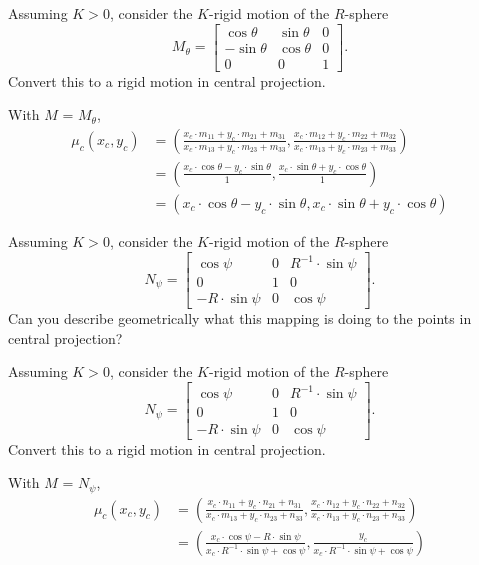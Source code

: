 \documentclass{ximera}
\begin{document}
\begin{problem}
  Assuming $K > 0$, consider the $K$-rigid motion of the $R$-sphere
  \[
  M_\theta=
  \begin{bmatrix}
    \cos\theta & \sin\theta & 0\\
    -\sin\theta & \cos\theta & 0\\
    0 & 0 & 1
  \end{bmatrix}.
  \]
  Convert this to a rigid motion in central projection.
  \begin{freeResponse}
   With $M$ = $M_\theta$,
  \begin{align*}
  \mu_c(x_c,y_c) &= \left( \frac{x_c\cdot m_{11} + y_c\cdot m_{21} + m_{31}}{x_c\cdot m_{13} + y_c\cdot m_{23} + m_{33}},
    \frac{x_c\cdot m_{12} + y_c\cdot m_{22} + m_{32}}{x_c\cdot m_{13} + y_c\cdot m_{23} + m_{33}} \right) \\
    &= \left( \frac{x_c\cdot \cos\theta - y_c\cdot \sin\theta}{1},
    \frac{x_c\cdot \sin\theta + y_c \cdot \cos\theta}{1} \right) \\
    &= \left( x_c\cdot \cos\theta - y_c\cdot \sin\theta,
    x_c\cdot \sin\theta+ y_c \cdot \cos\theta \right)
  \end{align*}
  \end{freeResponse}
\end{problem}


\begin{problem}
  Assuming $K > 0$, consider the $K$-rigid motion of the $R$-sphere
  \[
  N_\psi=
  \begin{bmatrix}
    \cos\psi & 0 & R^{-1}\cdot\sin\psi\\
    0 & 1 & 0\\
    -R\cdot\sin\psi & 0 & \cos\psi
  \end{bmatrix}.
  \]
Can you describe geometrically what this mapping is doing to the
points in central projection?  
\end{problem}


\begin{problem}
  Assuming $K > 0$, consider the $K$-rigid motion of the $R$-sphere
  \[
  N_\psi=
  \begin{bmatrix}
    \cos\psi & 0 & R^{-1}\cdot\sin\psi\\
    0 & 1 & 0\\
    -R\cdot\sin\psi & 0 & \cos\psi
  \end{bmatrix}.
  \]
  Convert this to a rigid motion in central projection.
  
  \begin{freeResponse}
   With $M$ = $N_\psi$,
  \begin{align*}
  \mu_c(x_c,y_c) &= \left( \frac{x_c\cdot n_{11} + y_c\cdot n_{21} + n_{31}}{x_c\cdot m_{13} + y_c\cdot n_{23} + n_{33}},
    \frac{x_c\cdot n_{12} + y_c\cdot n_{22} + n_{32}}{x_c\cdot n_{13} + y_c\cdot n_{23} + n_{33}} \right) \\
    &= \left( \frac{x_c\cdot \cos\psi - R\cdot \sin\psi}{x_c\cdot R^{-1} \cdot \sin\psi + \cos\psi},
    \frac{y_c}{x_c\cdot R^{-1} \cdot \sin\psi + \cos\psi} \right) 
  \end{align*}
  \end{freeResponse}

\end{problem}
\end{document}

